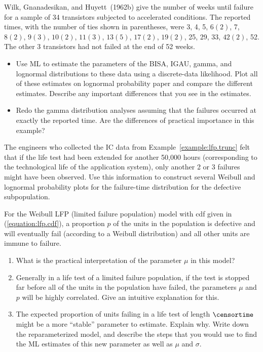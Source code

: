 \begin{exercise}
Wilk, Gnanadesikan, and Huyett~(1962b) give the number of weeks
until failure for a sample of 34 transistors subjected to
accelerated conditions. The reported times, with 
the number of ties shown in parentheses,
were 3, 4, 5, $ 6 (2) $, 7, $8 (2) $, $9 (3)$, $ 10 (2) $, $ 11 (3) $,
$ 13 (5) $, $ 17 (2)$, $19 (2) $, 25, 29, 33, $42 (2)$, 52.  The other 3
transistors had not failed at the end of 52 weeks.
\begin{itemize}
\item
Use ML to estimate the parameters of the BISA, IGAU, gamma, and
lognormal distributions to these data using a discrete-data
likelihood. Plot all of these estimates on lognormal probability paper
and compare the different estimates.  Describe any important
differences that you see in the estimates.
\item
Redo the gamma distribution analyses assuming that the failures
occurred at exactly the reported time.  Are the differences of
practical importance in this example?
\end{itemize}
\end{exercise}


\begin{exercise}
\label{exercise:lfp.sen.anal}
The engineers who collected the IC data from
Example~\ref{example:lfp.trunc} felt that if the life test had been
extended for another 50,000 hours (corresponding to the
technological life of the application system), only another 2 or 3
failures might have been observed.  Use this information to
construct several Weibull and lognormal probability plots for the
failure-time distribution for the defective subpopulation.
\end{exercise}



\begin{exercise}
\label{exercise:lfp.reparameterization}
For the Weibull LFP (limited failure population) model with cdf
given in (\ref{equation:lfp.cdf}),
a proportion $p$ of the units in the 
population is defective and will eventually
fail (according to a Weibull distribution)
and all other units are immune to failure.
\begin{enumerate}
\item
What is the practical interpretation of the parameter $\mu$ in this model?
\item
Generally in a life test of a limited failure population, if
the test is stopped far before all of the units in the population
have failed, the parameters $\mu$ and $p$ will be highly correlated.
Give an intuitive explanation for this.
\item
The expected proportion of units failing in a life test of length
$\censortime$ might be a more ``stable'' parameter to estimate.
Explain why. Write down the reparameterized model, and describe
the steps that you would use to find the ML estimates of this
new parameter as well as $\mu$ and $\sigma$.
\end{enumerate}
\end{exercise}


